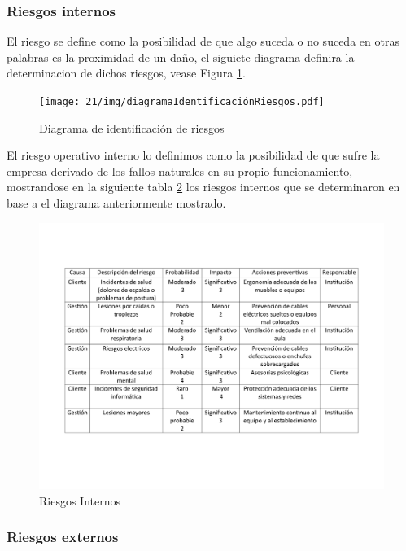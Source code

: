     \subsubsection{Riesgos internos}
    
    El riesgo se define como la posibilidad de que algo suceda o no suceda en otras palabras es la proximidad de un daño, el siguiete diagrama definira la determinacion de dichos riesgos, vease Figura \ref{fig:diagramaIdentificacionRiesgos}. 
    
    \begin{figure}[H]
        \centering
        \texttt{[image: 21/img/diagramaIdentificaciónRiesgos.pdf]}
        \caption{Diagrama de identificación de riesgos}
        \label{fig:diagramaIdentificacionRiesgos}
    \end{figure}
    
    El riesgo operativo interno lo definimos como la posibilidad de que sufre la empresa derivado de los fallos naturales en su propio funcionamiento, mostrandose en la siguiente tabla \ref{fig:riesgosInternos} los riesgos internos que se determinaron en base a el diagrama anteriormente mostrado.
    \begin{figure}[H]
        \centering
        \includegraphics[scale=0.3]{21/img/tablaRiesgosInternos.pdf}
        \caption{Riesgos Internos}
        \label{fig:riesgosInternos}
    \end{figure}
    
    
    
    \subsubsection{Riesgos externos}
    
